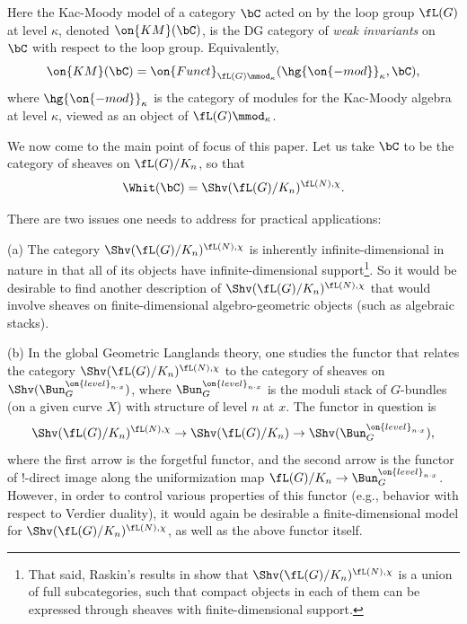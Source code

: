 \documentclass[9pt]{amsart}
\theoremstyle{definition}
\theoremstyle{remark}
\numberwithin{equation}{section}
\renewcommand{\mod}{{\on{-mod}}}
\begin{document}
\medskip

Here the Kac-Moody model of a category $\bC$ acted on by the loop group $\fL(G)$ at level $\kappa$,
denoted $\on{KM}(\bC)$, is the DG category of \emph{weak invariants} on $\bC$ with respect to
the loop group. Equivalently,
$$\on{KM}(\bC)=\on{Funct}_{\fL(G)\mmod_\kappa}(\hg\mod_\kappa,\bC),$$
where $\hg\mod_\kappa$ is the category of modules for the Kac-Moody algebra at level $\kappa$, viewed as an object of 
$\fL(G)\mmod_\kappa$.


\sssec{}  \label{sss:why global}

We now come to the main point of focus of this paper. Let us take $\bC$ to be the category
of sheaves on $\fL(G)/K_n$, so that
$$\Whit(\bC)=\Shv(\fL(G)/K_n)^{\fL(N),\chi}.$$

\medskip

There are two issues one needs to address for practical applications:

\medskip

\noindent(a) The category $\Shv(\fL(G)/K_n)^{\fL(N),\chi}$ is inherently infinite-dimensional in 
nature in that all of its objects have infinite-dimensional support\footnote{That said, Raskin's results in 
\cite{Ras} show that $\Shv(\fL(G)/K_n)^{\fL(N),\chi}$ is a union of full subcategories, such that
compact objects in each of them can be expressed through sheaves with finite-dimensional support.}. So it would be desirable to
find another description of $\Shv(\fL(G)/K_n)^{\fL(N),\chi}$ that would involve sheaves on 
finite-dimensional algebro-geometric objects (such as algebraic stacks).

\medskip

\noindent(b) In the global Geometric Langlands theory, one studies the functor that 
relates the category $\Shv(\fL(G)/K_n)^{\fL(N),\chi}$
to the category of sheaves on $\Shv(\Bun_G^{\on{level}_{n\cdot x}})$, where 
$\Bun_G^{\on{level}_{n\cdot x}}$ is the moduli stack of $G$-bundles (on a given curve $X$)
with structure of level $n$ at $x$. The functor in question is 
$$\Shv(\fL(G)/K_n)^{\fL(N),\chi}\to \Shv(\fL(G)/K_n)\to \Shv(\Bun_G^{\on{level}_{n\cdot x}}),$$
where the first arrow is the forgetful functor, and the second arrow is the functor of !-direct image along
the uniformization map $\fL(G)/K_n\to \Bun_G^{\on{level}_{n\cdot x}}$. However, in order to control 
various properties of this functor (e.g., behavior with respect to Verdier duality), it would again be desirable
a finite-dimensional model for $\Shv(\fL(G)/K_n)^{\fL(N),\chi}$, as well as the above functor itself.
\end{document}
